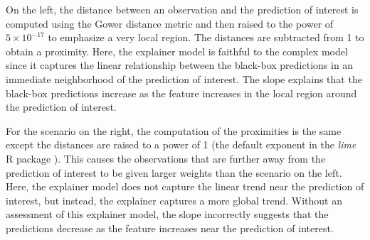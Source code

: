 \documentclass[AMS,STIX2COL]{WileyNJD-v2}\usepackage[]{graphicx}\usepackage[]{color}
\newcommand{\kge}[1]{\textcolor{teal}{#1}}
\renewcommand{\sout}[1]{\unskip}
\begin{document}
On the left, the distance between an observation and the prediction of interest is computed using the Gower distance metric \citep{gower:1971} and then raised to the power of \ensuremath{5\times 10^{-17}} to emphasize a very local region. The distances are subtracted from 1 to obtain a proximity. Here, the explainer model is faithful to the complex model since it captures the linear relationship between the black-box predictions in an immediate neighborhood of the prediction of interest. The slope  explains that the black-box predictions increase as the feature increases in the local region around the prediction of interest.

For the scenario on the right, the computation of the proximities is the same except the distances are raised to a power of 1 (the default exponent in the \emph{lime} R package \citep{pedersen:2020}). This causes the observations that are further away from the prediction of interest to be given larger weights than the scenario on the left. Here, the explainer model does not capture the linear trend near the prediction of interest, but instead, the explainer captures a more global trend. Without an assessment of this explainer model, the slope incorrectly suggests that the predictions decrease as the feature increases near the prediction of interest. %

\end{document}
